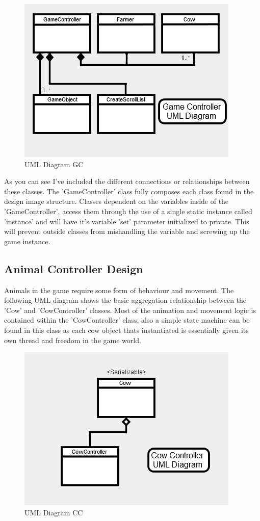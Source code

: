 \begin{figure}[!ht]
	\caption{UML Diagram GC}
	\centering
	\includegraphics{img/gc_uml.png}
\end{figure}

As you can see I've included the different connections or relationships between these classes. The 'GameController' class fully composes each class found in the design image structure. Classes dependent on the variables inside of the 'GameController', access them through the use of a single static instance called 'instance' and will have it's variable 'set' parameter initialized to private. This will prevent outside classes from mishandling the variable and screwing up the game instance.
\subsection{Animal Controller Design}
Animals in the game require some form of behaviour and movement. The following UML diagram shows the basic aggregation relationship between the 'Cow' and 'CowController' classes. Most of the animation and movement logic is contained within the 'CowController' class, also a simple state machine can be found in this class as each cow object thats instantiated is essentially given its own thread and freedom in the game world.

\begin{figure}[!ht]
	\caption{UML Diagram CC}
	\centering
	\includegraphics{img/cow_uml.png}
\end{figure}

